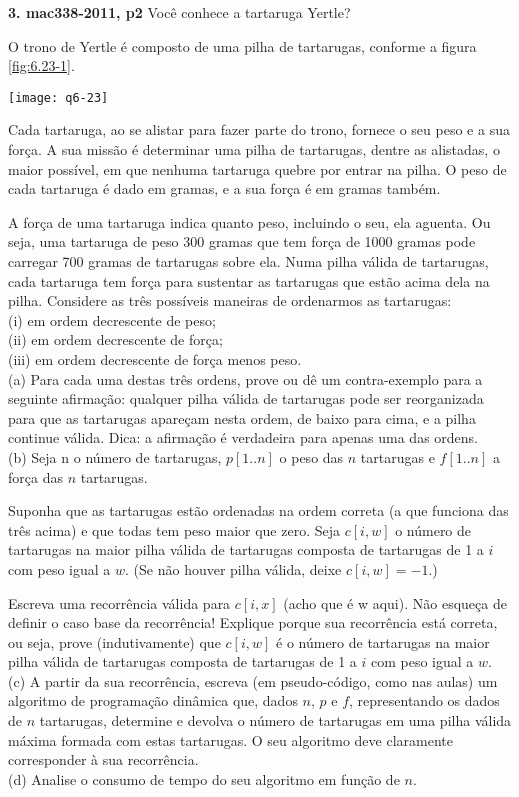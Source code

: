 
\noindent \textbf{3. mac338-2011, p2} Você conhece a tartaruga Yertle?

O trono de Yertle é composto de uma pilha de tartarugas, conforme a figura \ref{fig:6.23-1}.

\begin{center}
\texttt{[image: q6-23]}
\label{fig:6.23-1}
\end{center}

Cada tartaruga, ao se alistar para fazer parte do trono, fornece o seu peso e a sua força. A sua missão é determinar uma pilha de tartarugas, dentre as alistadas, o maior possível, em que nenhuma tartaruga quebre por entrar na pilha. O peso de cada tartaruga é dado em gramas, e a sua força é em gramas também.

A força de uma tartaruga indica quanto peso, incluindo o seu, ela aguenta. Ou seja, uma tartaruga de peso 300 gramas que tem força de 1000 gramas pode carregar 700 gramas de tartarugas sobre ela. Numa pilha válida de tartarugas, cada tartaruga tem força para sustentar as tartarugas que estão acima dela na pilha. Considere as três possíveis maneiras de ordenarmos as tartarugas:\\[6pt]

\noindent (i) em ordem decrescente de peso;\\[2pt]
(ii) em ordem decrescente de força;\\[2pt]
(iii) em ordem decrescente de força menos peso.\\[6pt]

\noindent (a) Para cada uma destas três ordens, prove ou dê um contra-exemplo para a seguinte afirmação: qualquer pilha válida de tartarugas pode ser reorganizada para que as tartarugas apareçam nesta ordem, de baixo para cima, e a pilha continue válida. Dica: a afirmação é verdadeira para apenas uma das ordens.\\[2pt]
\noindent (b) Seja n o número de tartarugas, $p[1..n]$ o peso das $n$ tartarugas e $f[1..n]$ a força das $n$ tartarugas.

Suponha que as tartarugas estão ordenadas na ordem correta (a que funciona das três acima) e que todas tem peso maior que zero. Seja $c[i, w]$ o número de tartarugas na maior pilha válida de tartarugas composta de tartarugas de 1 a $i$ com peso igual a $w$. (Se não houver pilha válida, deixe $c[i,w] = -1$.)

Escreva uma recorrência válida para $c[i, x]$ (acho que é w aqui). Não esqueça de definir o caso base da recorrência! Explique porque sua recorrência está correta, ou seja, prove (indutivamente) que $c[i,w]$ é o número de tartarugas na maior pilha válida de tartarugas composta de tartarugas de 1 a $i$ com peso igual a $w$.\\[2pt]
\noindent (c) A partir da sua recorrência, escreva (em pseudo-código, como nas aulas) um algoritmo de programação
dinâmica que, dados $n$, $p$ e $f$, representando os dados de $n$ tartarugas, determine e devolva o número de tartarugas em uma pilha válida máxima formada com estas tartarugas. O seu algoritmo deve claramente corresponder à sua recorrência.\\[2pt]
\noindent (d) Analise o consumo de tempo do seu algoritmo em função de $n$.